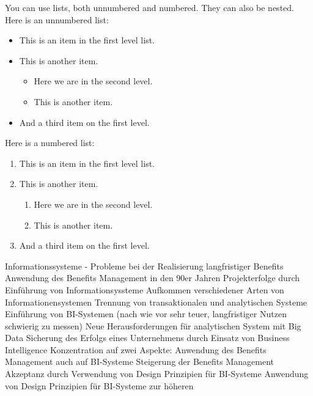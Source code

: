 \noindent
You can use lists, both unnumbered and numbered. They can also be nested. Here is an unnumbered list:

\begin{itemize}
\item This is an item in the first level list.
\item This is another item.
  \begin{itemize}
  \item Here we are in the second level.
  \item This is another item.
  \end{itemize}
\item And a third item on the first level.
\end{itemize}

Here is a numbered list:

\begin{enumerate}
\item This is an item in the first level list.
\item This is another item.
  \begin{enumerate}
  \item Here we are in the second level.
  \item This is another item.
  \end{enumerate}
\item And a third item on the first level.
\end{enumerate}


Informationssysteme - Probleme bei der Realisierung langfristiger Benefits
Anwendung des Benefits Management in den 90er Jahren
Projekterfolge durch Einführung von Informationsyssteme
Aufkommen verschiedener Arten von Informationensystemen
Trennung von transaktionalen und analytischen Systeme
Einführung von BI-Systemen (nach wie vor sehr teuer, langfristiger Nutzen schwierig zu messen)
Neue Herausforderungen für analytischen System mit Big Data
Sicherung des Erfolgs eines Unternehmens durch Einsatz von Business Intelligence
Konzentration auf zwei Aspekte:
Anwendung des Benefits Management auch auf BI-Systeme
Steigerung der Benefits Management Akzeptanz durch Verwendung von Design Prinzipien für BI-Systeme
Anwendung von Design Prinzipien für BI-Systeme zur höheren